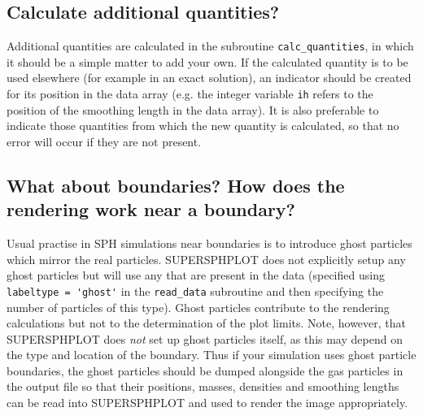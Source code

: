 \documentclass[a4paper,12pt]{article}
\begin{document}
\subsection{Calculate additional quantities?}
 Additional quantities are calculated in the subroutine \verb+calc_quantities+,
in which it should be a simple matter to add your own.
If the calculated quantity is to be used elsewhere (for example in an exact
solution), an indicator should be created for its position in the data array
(e.g. the integer variable \verb+ih+ refers to the position of the smoothing
length in the data array). It is also preferable to indicate those quantities
from which the new quantity is calculated, so that no error will occur if they
are not present.

\subsection{What about boundaries? How does the rendering work near a boundary?}
 Usual practise in SPH simulations near boundaries is
to introduce ghost particles which mirror the real particles. SUPERSPHPLOT does not
explicitly setup any ghost particles but will use any that are present in the data
(specified using \verb+labeltype = 'ghost'+ in the \verb+read_data+ subroutine and
then specifying the number of particles of this type). Ghost particles contribute
to the rendering calculations but not to the determination of the plot limits. Note,
however, that SUPERSPHPLOT does \emph{not} set up ghost particles itself, as this may depend
on the type and location of the boundary. Thus if your simulation uses ghost particle
boundaries, the ghost particles should be dumped alongside the gas particles in the
output file so that their positions, masses, densities and smoothing lengths can be
read into SUPERSPHPLOT and used to render the image appropriately.
\end{document}
